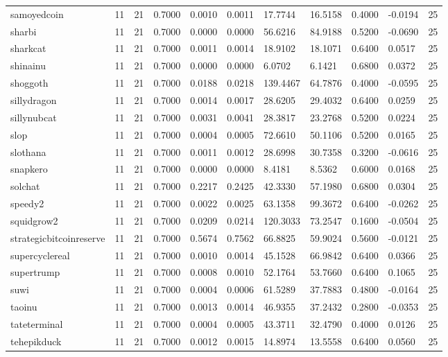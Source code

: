 \begin{table}[htbp]
\begin{tabular}{lllllllllll}
samoyedcoin & 11 & 21 & 0.7000 & 0.0010 & 0.0011 & 17.7744 & 16.5158 & 0.4000 & -0.0194 & 25 \\
sharbi & 11 & 21 & 0.7000 & 0.0000 & 0.0000 & 56.6216 & 84.9188 & 0.5200 & -0.0690 & 25 \\
sharkcat & 11 & 21 & 0.7000 & 0.0011 & 0.0014 & 18.9102 & 18.1071 & 0.6400 & 0.0517 & 25 \\
shinainu & 11 & 21 & 0.7000 & 0.0000 & 0.0000 & 6.0702 & 6.1421 & 0.6800 & 0.0372 & 25 \\
shoggoth & 11 & 21 & 0.7000 & 0.0188 & 0.0218 & 139.4467 & 64.7876 & 0.4000 & -0.0595 & 25 \\
sillydragon & 11 & 21 & 0.7000 & 0.0014 & 0.0017 & 28.6205 & 29.4032 & 0.6400 & 0.0259 & 25 \\
sillynubcat & 11 & 21 & 0.7000 & 0.0031 & 0.0041 & 28.3817 & 23.2768 & 0.5200 & 0.0224 & 25 \\
slop & 11 & 21 & 0.7000 & 0.0004 & 0.0005 & 72.6610 & 50.1106 & 0.5200 & 0.0165 & 25 \\
slothana & 11 & 21 & 0.7000 & 0.0011 & 0.0012 & 28.6998 & 30.7358 & 0.3200 & -0.0616 & 25 \\
snapkero & 11 & 21 & 0.7000 & 0.0000 & 0.0000 & 8.4181 & 8.5362 & 0.6000 & 0.0168 & 25 \\
solchat & 11 & 21 & 0.7000 & 0.2217 & 0.2425 & 42.3330 & 57.1980 & 0.6800 & 0.0304 & 25 \\
speedy2 & 11 & 21 & 0.7000 & 0.0022 & 0.0025 & 63.1358 & 99.3672 & 0.6400 & -0.0262 & 25 \\
squidgrow2 & 11 & 21 & 0.7000 & 0.0209 & 0.0214 & 120.3033 & 73.2547 & 0.1600 & -0.0504 & 25 \\
strategicbitcoinreserve & 11 & 21 & 0.7000 & 0.5674 & 0.7562 & 66.8825 & 59.9024 & 0.5600 & -0.0121 & 25 \\
supercyclereal & 11 & 21 & 0.7000 & 0.0010 & 0.0014 & 45.1528 & 66.9842 & 0.6400 & 0.0366 & 25 \\
supertrump & 11 & 21 & 0.7000 & 0.0008 & 0.0010 & 52.1764 & 53.7660 & 0.6400 & 0.1065 & 25 \\
suwi & 11 & 21 & 0.7000 & 0.0004 & 0.0006 & 61.5289 & 37.7883 & 0.4800 & -0.0164 & 25 \\
taoinu & 11 & 21 & 0.7000 & 0.0013 & 0.0014 & 46.9355 & 37.2432 & 0.2800 & -0.0353 & 25 \\
tateterminal & 11 & 21 & 0.7000 & 0.0004 & 0.0005 & 43.3711 & 32.4790 & 0.4000 & 0.0126 & 25 \\
tehepikduck & 11 & 21 & 0.7000 & 0.0012 & 0.0015 & 14.8974 & 13.5558 & 0.6400 & 0.0560 & 25 \\

\end{tabular}
\end{table}
